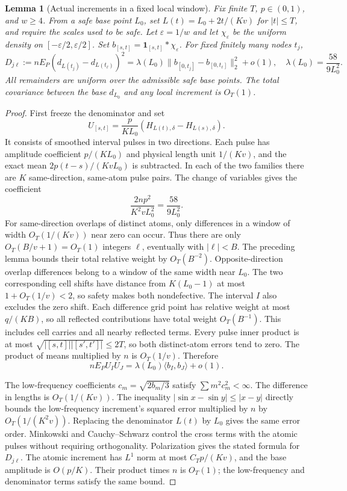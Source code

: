 \documentclass[a4paper,11pt]{article}
\newtheorem{lemma}{Lemma}[section]
\theoremstyle{remark}
\begin{document}
\begin{lemma}[Actual increments in a fixed local window]\label{lem:paperlocal}
Fix finite $T$, $p\in(0,1)$, and $w\ge4$. From a safe base point $L_0$, set
$L(t)=L_0+2t/(Kv)$ for $|t|\le T$, and require the scales used to be safe.
Let $\varepsilon=1/w$ and let $\chi_\varepsilon$ be the uniform density on $[-\varepsilon/2,\varepsilon/2]$.
Set $b_{[s,t]}=\mathbf1_{[s,t]}*\chi_\varepsilon$.
For fixed finitely many nodes $t_j$,
\[
 D_{j\ell}:=nE_P(d_{L(t_j)}-d_{L(t_\ell)})^2
 =\lambda(L_0)\|b_{[0,t_j]}-b_{[0,t_\ell]}\|_2^2+o(1),
 \quad\lambda(L_0)=\frac{58}{9L_0^2}.
\]
All remainders are uniform over the admissible safe base points. The total covariance between the base $d_{L_0}$ and any local increment
is $O_T(1)$.
\end{lemma}
\begin{proof}
First freeze the denominator and set
\[
 U_{[s,t]}=\frac p{KL_0}(H_{L(t),\delta}-H_{L(s),\delta}).
\]
It consists of smoothed interval pulses in two directions. Each pulse has amplitude coefficient $p/(KL_0)$
and physical length unit $1/(Kv)$, and the exact mean $2p(t-s)/(K vL_0)$ is subtracted.
In each of the two families there are $K$ same-direction, same-atom pulse pairs. The change of variables gives the coefficient
\[
 \frac{2np^2}{K^2vL_0^2}=\frac{58}{9L_0^2}.
\]
For same-direction overlaps of distinct atoms, only differences in a window of width $O_T(1/(Kv))$ near zero can occur. Thus there are only
$O_T(B/v+1)=O_T(1)$ integers $\ell$, eventually with $|\ell|<B$.
The preceding lemma bounds their total relative weight by $O_T(B^{-2})$.
Opposite-direction overlap differences belong to a window of the same width near $L_0$. The two corresponding cell shifts have distance from
$K(L_0-1)$ at most $1+O_T(1/v)<2$, so safety makes both nondefective.
The interval $I$ also excludes the zero shift. Each difference grid point has relative weight at most $q/(KB)$, so all reflected contributions
have total weight $O_T(B^{-1})$. This includes cell carries and all nearby reflected terms.
Every pulse inner product is at most $\sqrt{|[s,t]||[s',t']|}\le2T$, so both distinct-atom errors tend to zero.
The product of means multiplied by $n$ is $O_T(1/v)$.
Therefore
\[
 nE_PU_IU_J=\lambda(L_0)\langle b_I,b_J\rangle+o(1).
\]

The low-frequency coefficients $c_m=\sqrt{2b_m/3}$ satisfy $\sum m^2c_m^2<\infty$.
The difference in lengths is $O_T(1/(Kv))$. The inequality $|\sin x-\sin y|\le|x-y|$ directly bounds the low-frequency increment's
squared error multiplied by $n$ by $O_T(1/(K^2v))$. Replacing the denominator $L(t)$ by $L_0$ gives the same error order.
Minkowski and Cauchy--Schwarz control the cross terms with the atomic pulses without requiring orthogonality.
Polarization gives the stated formula for $D_{j\ell}$.
The atomic increment has $L^1$ norm at most $C_Tp/(Kv)$, and the base amplitude is $O(p/K)$.
Their product times $n$ is $O_T(1)$; the low-frequency and denominator terms satisfy the same bound.


\end{proof}
\end{document}
